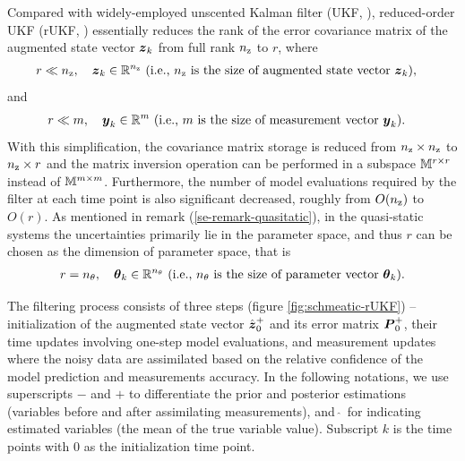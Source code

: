 Compared with widely-employed unscented Kalman filter (UKF, \citealt{Julier1995New}), reduced-order UKF (rUKF, \citealt{Moireau2010Reduced}) essentially reduces the rank of the error covariance matrix of the augmented state vector $\vect{z}_k$ from full rank $n_\textnormal{z}$ to $r$, where
\begin{align}
r &\ll n_\textnormal{z}, \quad \vect{z}_k \in \Real^{n_\textnormal{z}}  \textnormal{ (i.e., $n_\textnormal{z}$ is the size of augmented state vector $\vect{z}_k$)}, \label{eq-system-size-01}
\end{align}
and
\begin{align}
r &\ll m, \quad \vect{y}_k \in \Real^{m} \textnormal{ (i.e., $m$ is the size of measurement vector $\vect{y}_k$)}. \label{eq-system-size-02}
\end{align}
With this simplification, the covariance matrix storage is reduced from $n_\textnormal{z} \times n_\textnormal{z}$ to $n_\textnormal{z} \times r$ and the matrix inversion operation can be performed in a subspace $\mathbb{M}^{r \times r}$ instead of $\mathbb{M}^{m \times m}$. Furthermore, the number of model evaluations required by the filter at each time point is also significant decreased, roughly from $O(n_\textnormal{z})$ to $O(r)$. As mentioned in remark (\ref{se-remark-quasitatic}), in the quasi-static systems the uncertainties primarily lie in the parameter space, and thus $r$ can be chosen as the dimension of parameter space, that is
\begin{align}
    r=n_\theta, \quad \vect{\theta}_k \in \Real^{n_\theta} \textnormal{ (i.e., $n_\theta$ is the size of parameter vector $\vect{\theta}_k$)}. \label{eq-system-size-03}
\end{align}


The filtering process consists of three steps (figure \ref{fig:schmeatic-rUKF}) -- initialization of the augmented state vector $\hat{\vect{z}}_{0}^{+}$ and its error matrix $\matr{P}_0^+$, their time updates involving one-step model evaluations, and measurement updates where the noisy data are assimilated based on the relative confidence of the model prediction and measurements accuracy.   In the following notations, we use superscripts $-$ and $+$ to differentiate the prior and posterior estimations (variables before and after assimilating measurements), and $\, \hat{ } \, $  for indicating estimated variables (the mean of the true variable value). Subscript $k$ is the time points with $0$ as the initialization time point.

